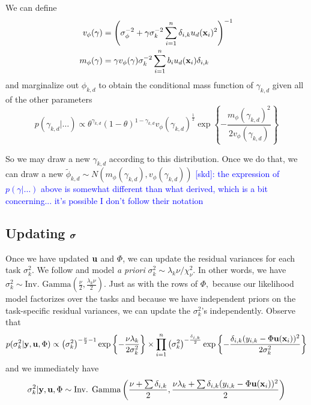 \documentclass[12pt]{article}
\begin{document}
We can define
\begin{align*}
v_{\phi}(\gamma) &= \left(\sigma_{\phi}^{-2} + \gamma\sigma^{-2}_{k}\sum_{i = 1}^{n}{\delta_{i,k}u_{d}(\mathbf{x}_{i})^{2}}\right)^{-1} \\
m_{\phi}(\gamma) &= \gamma v_{\phi}(\gamma)\sigma^{-2}_{k}\sum_{i = 1}^{n}{b_{i}u_{d}(\mathbf{x}_{i})\delta_{i,k}}
\end{align*}
and marginalize out $\phi_{k,d}$ to obtain the conditional mass function of $\gamma_{k,d}$ given all of the other parameters
$$
p(\gamma_{k,d} | \ldots) \propto \theta^{\gamma_{k,d}}(1 - \theta)^{1 - \gamma_{k,d}}v_{\phi}(\gamma_{k,d})^{\frac{1}{2}}\exp\left\{-\frac{m_{\phi}(\gamma_{k,d})^{2}}{2v_{\phi}(\gamma_{k,d})}\right\}
$$

So we may draw a new $\gamma_{k,d}$ according to this distribution.
Once we do that, we can draw a new $\tilde{\phi}_{k,d} \sim N(m_{\phi}(\gamma_{k,d}), v_{\phi}(\gamma_{k,d}))$
\textcolor{blue}{[skd]: the expression of $p(\gamma | \ldots)$ above is somewhat different than what \citet{Titsias2011} derived, which is a bit concerning... it's possible I don't follow their notation}

\subsection{Updating $\boldsymbol{\sigma}$}
Once we have updated $\mathbf{u}$ and $\Phi$, we can update the residual variances for each task $\sigma^{2}_{k}.$
We follow \citet{Chipman2010} and model \textit{a priori} $\sigma_{k}^{2} \sim \lambda_{k}\nu/\chi^{2}_{\nu}.$
In other words, we have $\sigma^{2}_{k} \sim \text{Inv. Gamma}\left(\frac{\nu}{2}, \frac{\lambda_{k}\nu}{2}\right).$
Just as with the rows of $\Phi,$ because our likelihood model factorizes over the tasks and because we have independent priors on the task-specific residual variances, we can update the $\sigma^{2}_{k}$'s independently.
Observe that
$$
p(\sigma^{2}_{k} | \mathbf{y}, \mathbf{u}, \Phi) \propto \left(\sigma^{2}_{k}\right)^{-\frac{\nu}{2} - 1}\exp\left\{-\frac{\nu\lambda_{k}}{2\sigma^{2}_{k}}\right\} \times \prod_{i = 1}^{n}{\left(\sigma_{k}^{2}\right)^{-\frac{\delta_{i,k}}{2}}\exp\left\{-\frac{\delta_{i,k}(y_{i,k} - \Phi\mathbf{u}(\mathbf{x}_{i}))^{2}}{2\sigma^{2}_{k}}\right\}}
$$
and we immediately have
$$
\sigma^{2}_{k} | \mathbf{y}, \mathbf{u}, \Phi \sim \text{Inv. Gamma}\left(\frac{\nu + \sum{\delta_{i,k}}}{2}, \frac{\nu\lambda_{k} + \sum{\delta_{i,k}(y_{i,k} - \Phi\mathbf{u}(\mathbf{x}_{i}))^{2}}}{2}\right)
$$
\end{document}
